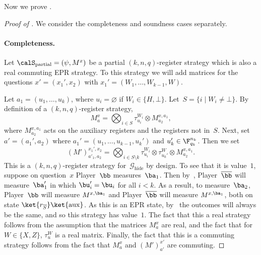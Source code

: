 \documentclass[11pt]{article}
\newcommand{\hideq}{H}
\newcommand{\noop}{\bot}
\newcommand{\game}{\mathscr{G}}
\begin{document}
Now we prove .
\begin{proof}[Proof of ]
We consider the completeness and soundness cases separately.

\paragraph{Completeness.}
Let $\calS_{\mathrm{partial}} = (\psi, M^x)$ be a partial
$(k,n,q)$-register strategy which is also a real commuting EPR strategy.
To this strategy we will add matrices for the questions $x' = (x_1', x_2)$ with $x_1' = (W_1, \ldots, W_{k-1}, W)$.

Let $a_1 = (u_1, \ldots, u_k)$, where $u_i = \varnothing$ if $W_i \in \{\hideq, \noop\}$.
Let~$S = \{i \mid W_i \neq \noop\}$.
By definition of a $(k, n, q)$-register strategy,
\begin{equation*}
M^x_a = \bigotimes_{i \in S} \tau^{W_i}_{u_i} \otimes M^{x, a_1}_{a_2},
\end{equation*}
where $M^{x,a_1}_{a_2}$ acts on the auxiliary registers and the registers not in~$S$.
Next, set $a' = (a_1', a_2)$ where $a_1' = (u_1, \ldots, u_{k-1}, u_k')$ and $u_k' \in \F_{q_k}^{n_k}$.  Then we set
\begin{equation*}
(M')^{x_1', x_2}_{a'_1, a_2} = \bigotimes_{i \in S\setminus k} \tau^{W_i}_{u_i} \otimes \tau^{W}_{u_k'} \otimes M^{x, a_1}_{a_2}.
\end{equation*}
This is a $(k,n,q)$-register strategy for~$\game_{\mathrm{hide}}$ by design.
To see that it is value~$1$, suppose on question~$x$ Player~$\bb$ measures~$\ba_1$.
Then by~, Player~$\overline{\bb}$ will measure~$\ba_1'$ in which $\bu_i' = \bu_i$ for all $i < k$.
As a result, to measure~$\ba_2$, Player~$\bb$ will measure $M^{x, \ba_1}$
and Player~$\overline{\bb}$ will measure $M^{x, \ba_1}$, both on state $\ket{r_{\overline{S}}}\ket{\mathrm{aux}}$.
As this is an EPR state,
by~
the outcomes will always be the same, and so this strategy has
value~$1$. The fact that this a real strategy follows from the
assumption that the matrices $M^x_a$ are real, and the fact that for
$W \in \{X, Z\}$, $\tau^W_u$ is a real matrix.
Finally, the fact that this is a commuting strategy follows from the fact that $M^x_a$ and $(M')^{x'}_{a'}$ are commuting.


\end{proof}
\end{document}
